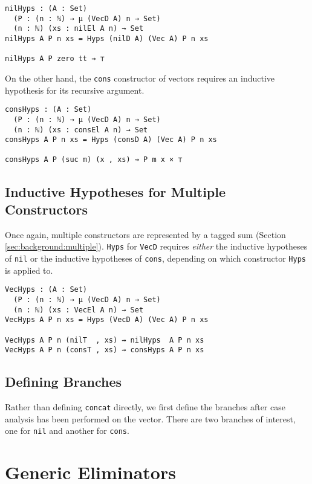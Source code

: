 \documentclass[preprint,nonatbib]{sigplanconf}
\newcommand{\refsec}[1]{Section \ref{sec:#1}}
\begin{document}
\begin{verbatim}
nilHyps : (A : Set)
  (P : (n : ℕ) → μ (VecD A) n → Set)
  (n : ℕ) (xs : nilEl A n) → Set
nilHyps A P n xs = Hyps (nilD A) (Vec A) P n xs

nilHyps A P zero tt ⇝ ⊤
\end{verbatim}

On the other hand, the {\tt cons} constructor of vectors requires an
inductive hypothesis for its recursive argument.

\begin{verbatim}
consHyps : (A : Set)
  (P : (n : ℕ) → μ (VecD A) n → Set)
  (n : ℕ) (xs : consEl A n) → Set
consHyps A P n xs = Hyps (consD A) (Vec A) P n xs

consHyps A P (suc m) (x , xs) ⇝ P m x × ⊤
\end{verbatim}

\subsection{Inductive Hypotheses for Multiple Constructors}

Once again, multiple constructors are represented by a tagged
sum (\refsec{background:multiple}). {\tt Hyps} for
{\tt VecD} requires {\it either} the inductive hypotheses of
{\tt nil} or the inductive hypotheses of {\tt cons}, depending on
which constructor {\tt Hyps} is applied to.

\begin{verbatim}
VecHyps : (A : Set)
  (P : (n : ℕ) → μ (VecD A) n → Set)
  (n : ℕ) (xs : VecEl A n) → Set
VecHyps A P n xs = Hyps (VecD A) (Vec A) P n xs

VecHyps A P n (nilT  , xs) ⇝ nilHyps  A P n xs 
VecHyps A P n (consT , xs) ⇝ consHyps A P n xs 
\end{verbatim}

\subsection{Defining Branches}

Rather than defining {\tt concat} directly, we first define the
branches after case analysis has been performed on the vector. There
are two branches of interest, one for {\tt nil} and another for
{\tt cons}.

\section{Generic Eliminators}
\label{sec:elim}
\end{document}
